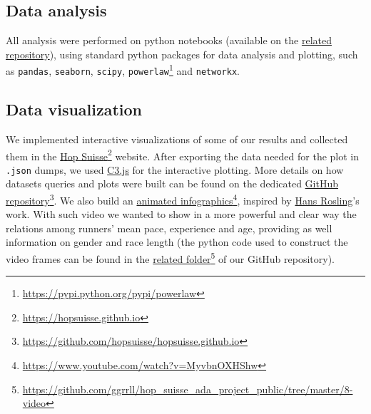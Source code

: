 \documentclass[fleqn,10pt]{wlscirep}
\begin{document}
		
	
	
	\subsection*{Data analysis}
	
		All analysis were performed on python notebooks (available on the \href{related repository}{related repository}), using standard python packages for data analysis and plotting, such as \texttt{pandas}, \texttt{seaborn}, \texttt{scipy}, \texttt{powerlaw}\footnote{\url{https://pypi.python.org/pypi/powerlaw}} and \texttt{networkx}.
	
	
	\subsection*{Data visualization}		
	
		We implemented interactive visualizations of some of our results and collected  them in the   \href{https://hopsuisse.github.io}{Hop Suisse}\footnote{\url{https://hopsuisse.github.io}} website.
		After exporting the data needed for the plot in \texttt{.json} dumps, we used \href{http://c3js.org}{C3.js} for the interactive plotting. More details on how datasets queries and plots were built can be found on the dedicated \href{https://github.com/hopsuisse/hopsuisse.github.io}{GitHub repository}\footnote{\url{https://github.com/hopsuisse/hopsuisse.github.io}}.
		We also build an \href{https://www.youtube.com/watch?v=MyvbnOXHShw}{animated infographics}\footnote{\url{https://www.youtube.com/watch?v=MyvbnOXHShw}}, inspired by  \href{https://en.wikipedia.org/wiki/Hans_Rosling}{Hans Rosling}'s work. With such video we wanted to show in a more powerful and clear way the relations among runners' mean pace, experience and age, providing as well information on gender and race length
		(the python code used to construct the video frames can be found in the \href{https://github.com/ggrrll/hop_suisse_ada_project_public/tree/master/8-video}{related folder}\footnote{\url{https://github.com/ggrrll/hop_suisse_ada_project_public/tree/master/8-video}} of our GitHub repository).
	

%
\end{document}
